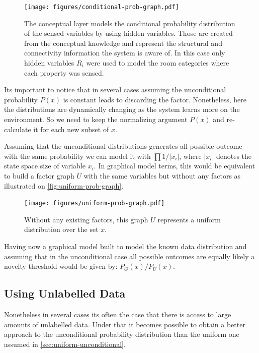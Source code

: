 \documentclass[runningheads,a4paper]{llncs}
\begin{document}
\begin{figure}[h]
\centering
\texttt{[image: figures/conditional-prob-graph.pdf]}
\caption{\label{fig:conditional-prob-graph}The conceptual layer models the conditional
         probability distribution of the sensed variables by using hidden variables.
         Those are created from the conceptual knowledge and represent the structural
         and connectivity information the system is aware of.
         In this case only hidden variables $R_i$ were used to model the room categories
         where each property was sensed.}
\end{figure}


Its important to notice that in several cases assuming the unconditional probability $P(x)$ is constant leads to discarding the factor.
Nonetheless, here the distributions are dynamically changing as the system learns more on the environment.
So we need to keep the normalizing argument $P(x)$ and re-calculate it for each new subset of $x$.

Assuming that the unconditional distributions generates all possible outcome with the same probability
we can model it with $\prod{1/|x_i|}$, where $|x_i|$ denotes the state space size of variable $x_i$.
In graphical model terms, this would be equivalent to build a factor graph $U$ with the same variables but
without any factors as illustrated on \autoref{fig:uniform-prob-graph}.

\begin{figure}
\centering
\texttt{[image: figures/uniform-prob-graph.pdf]}
\caption{\label{fig:uniform-prob-graph}Without any existing factors, this graph $U$ represents a uniform
         distribution over the set $x$.}
\end{figure}

Having now a graphical model built to model the known data distribution and assuming that in the unconditional case all possible outcomes are equally likely a novelty threshold would be given by: $P_G(x)/P_{U}(x)$.


\subsection{Using Unlabelled Data}
Nonetheless in several cases its often the case that there is access to large amounts of unlabelled data.
Under that it becomes possible to obtain a better approach to the unconditional probability distribution than
the uniform one assumed in \autoref{sec:uniform-unconditional}.
\end{document}
